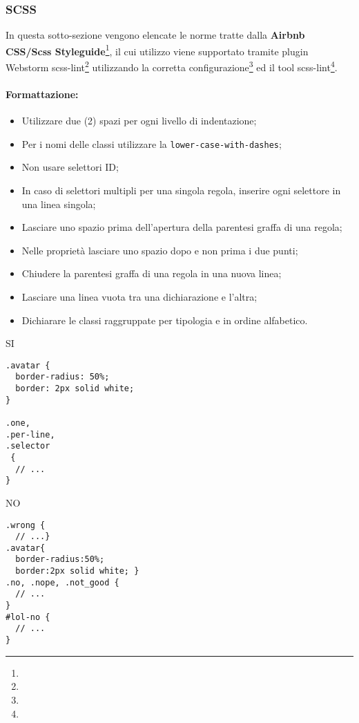 \documentclass[../ProcessiPrimari.tex]{subfiles}
\begin{document}
	
\subsubsection{SCSS}
In questa sotto-sezione vengono elencate le norme tratte dalla \textbf{Airbnb\\ CSS/Scss Styleguide}\footnote{}, il cui utilizzo viene supportato tramite plugin Webstorm scss-lint\footnote{} utilizzando la corretta configurazione\footnote{} ed il tool scss-lint\footnote{}.
\paragraph*{Formattazione:}
\begin{itemize}
	\item Utilizzare due (2) spazi per ogni livello di indentazione;
	\item Per i nomi delle classi utilizzare la \texttt{lower-case-with-dashes};
	\item Non usare selettori ID;
	\item In caso di selettori multipli per una singola regola, inserire ogni selettore in una linea singola;
	\item Lasciare uno spazio prima dell'apertura della parentesi graffa di una regola;
	\item Nelle proprietà lasciare uno spazio dopo e non prima i due punti;
	\item Chiudere la parentesi graffa di una regola in una nuova linea;
	\item Lasciare una linea vuota tra una dichiarazione e l'altra;
	\item Dichiarare le classi raggruppate per tipologia e in ordine alfabetico.
\end{itemize}
\begin{center}{
\begin{minipage}{6cm}
{\begin{center}SI\end{center}}
\begin{Verbatim}[frame=single]
.avatar {
  border-radius: 50%;
  border: 2px solid white;
}

.one,
.per-line,
.selector
 {
  // ...
}
\end{Verbatim}
\end{minipage}
\hfil
\begin{minipage}{7cm}
{\begin{center}NO\end{center}}
\begin{Verbatim}[frame=single]
.wrong {
  // ...}
.avatar{
  border-radius:50%;
  border:2px solid white; }
.no, .nope, .not_good {
  // ...
}
#lol-no {
  // ...
}

\end{Verbatim}
\end{minipage}
}
\end{center}
\end{document}
